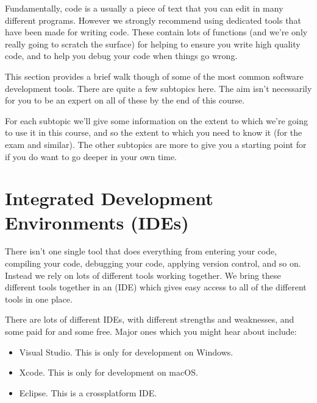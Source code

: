 \documentclass[letterpaper,10pt,british]{sphinxmanual}
\begin{document}
\sphinxAtStartPar
Fundamentally, code is a usually a piece of text that you can edit in many different programs. However we strongly recommend using dedicated tools that have been made for writing code. These contain lots of functions (and we’re only really going to scratch the surface) for helping to ensure you write high quality code, and to help you debug your code when things go wrong.

\sphinxAtStartPar
This section provides a brief walk though of some of the most common software development tools. There are quite a few sub\sphinxhyphen{}topics here. The aim isn’t necessarily for you to be an expert on all of these by the end of this course.

\sphinxAtStartPar
For each sub\sphinxhyphen{}topic we’ll give some information on the extent to which we’re going to use it in this course, and so the extent to which you need to know it (for the exam and similar). The other sub\sphinxhyphen{}topics are more to give you a starting point for if you do want to go deeper in your own time.

\sphinxstepscope


\section{Integrated Development Environments (IDEs)}
\label{\detokenize{chapters/software_development_tools/ide:integrated-development-environments-ides}}\label{\detokenize{chapters/software_development_tools/ide::doc}}
\sphinxAtStartPar
There isn’t one single tool that does everything from entering your code, compiling your code, debugging your code, applying version control, and so on. Instead we rely on lots of different tools working together. We bring these different tools together in an  (IDE) which gives easy access to all of the different tools in one place.

\sphinxAtStartPar
There are lots of different IDEs, with different strengths and weaknesses, and some paid for and some free. Major ones which you might hear about include:
\begin{itemize}
\item {} 
\sphinxAtStartPar
Visual Studio. This is only for development on Windows.

\item {} 
\sphinxAtStartPar
Xcode. This is only for development on macOS.

\item {} 
\sphinxAtStartPar
Eclipse. This is a cross\sphinxhyphen{}platform IDE.

\end{itemize}
\end{document}
